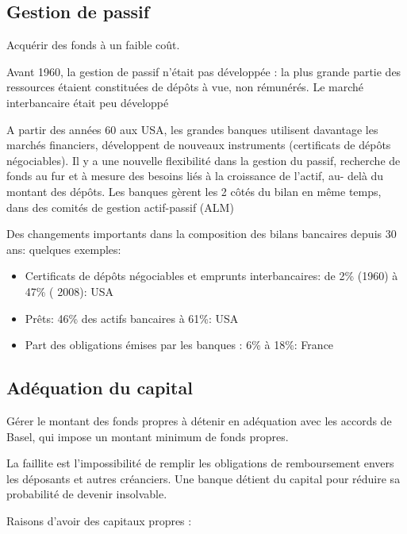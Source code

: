 	\subsection{Gestion de passif}
	
	Acquérir des fonds à un faible coût.
	
	Avant 1960, la gestion de passif n'était pas développée : la plus grande partie des ressources étaient constituées de dépôts à vue, non rémunérés. Le marché interbancaire était peu développé 

	A partir des années 60 aux USA, les grandes banques utilisent davantage les marchés financiers, développent de nouveaux instruments (certificats de dépôts négociables). Il y a une nouvelle flexibilité dans la gestion du passif, recherche de fonds au fur et à mesure des besoins liés à la croissance de l'actif, au- delà du montant des dépôts. Les banques gèrent les 2 côtés du bilan en même 
temps, dans des comités de gestion actif-passif 
(ALM) 

Des changements importants dans la composition 
des bilans bancaires depuis 30 ans: quelques 
exemples: 
\begin{itemize}
	\item Certificats de dépôts négociables et emprunts 
interbancaires: de 2\% (1960) à 47\% ( 2008): USA 
	\item Prêts: 46\% des actifs bancaires à 61\%: USA 
	\item Part des obligations émises par les banques : 6\% à 
18\%: France 
\end{itemize}

	\subsection{Adéquation du capital}
	
	Gérer le montant des fonds propres à détenir en adéquation avec les accords de Basel, qui impose un montant minimum de fonds propres.
	
	 La faillite est l'impossibilité de remplir les obligations de remboursement envers les déposants et autres créanciers. Une banque détient du capital pour réduire sa probabilité de devenir 
insolvable.
	
	Raisons d'avoir des capitaux propres :
	
